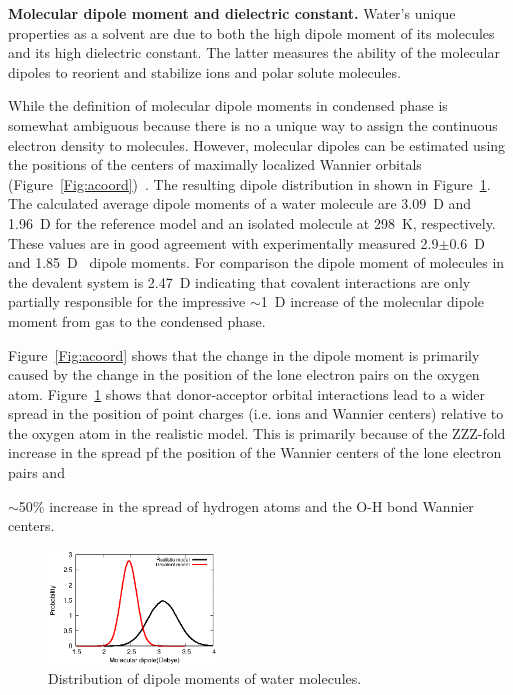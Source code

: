 \documentclass[aps,prl,reprint,amsmath,amssymb]{revtex4-1}
\begin{document}
\textbf{Molecular dipole moment and dielectric constant.} Water's unique properties as a solvent are due to both the high dipole moment of its molecules and its high dielectric constant. 
The latter measures the ability of the molecular dipoles to reorient and stabilize ions and polar solute molecules. 

While the definition of molecular dipole moments in condensed phase is somewhat ambiguous because there is no a unique way to assign the continuous electron density to molecules. 
However, molecular dipoles can be estimated using the positions of the centers of maximally localized Wannier orbitals (Figure~\ref{Fig:acoord})~\cite{marzari1997maximally,sharma2007dipolar}. 
The resulting dipole distribution in shown in Figure~\ref{Fig:dipoledist}. 
The calculated average dipole moments of a water molecule are 3.09~D and 1.96~D for the reference model and an isolated molecule at 298~K, respectively. These values are in good agreement with experimentally measured 2.9$\pm$0.6~D~\cite{badyal2000electron} and 1.85~D~\cite{haynes2014crc} dipole moments. For comparison the dipole moment of molecules in the devalent system is 2.47~D indicating that covalent interactions are only partially responsible for the impressive $\sim$1~D increase of the molecular dipole moment from gas to the condensed phase. 

Figure~\ref{Fig:acoord} shows that the change in the dipole moment is primarily caused by the change in the position of the lone electron pairs on the oxygen atom. 
Figure~\ref{Fig:dipoledist} shows that donor-acceptor orbital interactions lead to a wider spread in the position of point charges (i.e. ions and Wannier centers) relative to the oxygen atom in the realistic model. 
This is primarily because of the ZZZ-fold increase in the spread pf the position of the Wannier centers of the lone electron pairs and  


$\sim$50\% increase in the spread of hydrogen atoms and the O-H bond Wannier centers.

\begin{figure}
\includegraphics[width=0.4\textwidth]{new_dipole}
\caption{Distribution of dipole moments of water molecules.} \label{Fig:dipoledist}

\end{figure}
\end{document}
